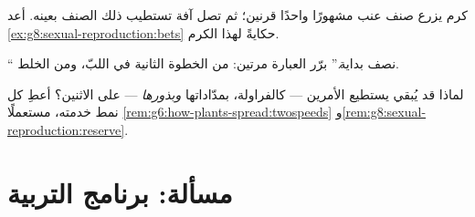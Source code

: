 \begin{exercise}[$\star\star$]\label{exo:g8:sexual-reproduction:10}
كرم يزرع صنف عنب مشهورًا واحدًا  قرنين؛ ثم تصل آفة تستطيب
ذلك الصنف بعينه. أعد \cref{ex:g8:sexual-reproduction:bets} حكايةً
لهذا الكرم.
\end{exercise}

\begin{exercise}[$\star\star$]\label{exo:g8:sexual-reproduction:11}
`` نصف بداية.'' برّر العبارة مرتين: من الخطوة الثانية في
اللبّ، ومن الخلط.
\end{exercise}

\begin{exercise}[$\star\star\star$]\label{exo:g8:sexual-reproduction:12}
لماذا قد يُبقي  يستطيع الأمرين --- كالفراولة، بمدّاداتها
\emph{وبذورها} --- على الاثنين؟ أعطِ كل نمط خدمته، مستعملًا
\cref{rem:g6:how-plants-spread:twospeeds}
و\cref{rem:g8:sexual-reproduction:reserve}.
\end{exercise}

\section{مسألة: برنامج التربية}

